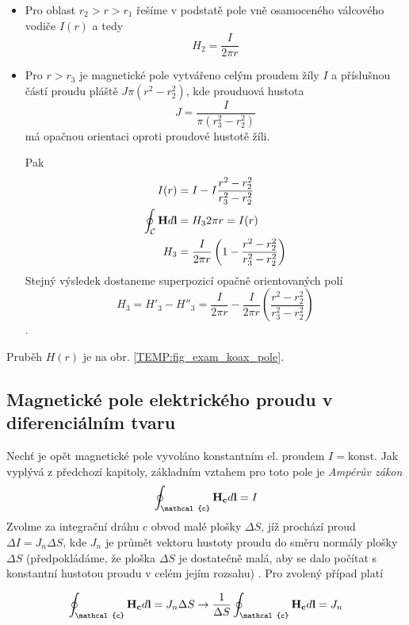 \begin{example}
\begin{itemize}
  		  \item Pro oblast $r_2>r>r_1$ řešíme v podstatě pole vně osamoceného válcového vodiče
  		        $I(r)$ a tedy $$H_2 = \frac{I}{2\pi r}$$
  		  \item Pro $r>r_3$ je magnetické pole vytvářeno celým proudem žíly $I$ a příslušnou částí
  		        proudu pláště $J\pi(r^2 - r_2^2)$, kde prouduová hustota $$J =
  		        \frac{I}{\pi(r_3^2-r_2^2)}$$ má opačnou orientaci oproti proudové hustotě žíli.
  		  
  		  Pak 
  		   \begin{align*}
			 I(r)                           &= I - I\frac{r^2-r_2^2}{r_3^2-r_2^2} \\
			 \oint_\mathcal{C}\mathbf{H}d\mathbf{l} &= H_32\pi r = I(r)                   \\				  
			 H_3                            &= \frac{I}{2\pi r}\left(1 - 
			                                   \frac{r^2 - r_2^2}{r_3^2 - r_2^2}\right) 
		   \end{align*}
		  Stejný výsledek dostaneme superpozicí opačně orientovaných polí $$H_3 = H'_3 - H''_3 =
		  \frac{I}{2\pi r} - \frac{I}{2\pi r}\left(\frac{r^2 - r_2^2}{r_3^2 - r_2^2}\right)$$. 
        \end{itemize}
        Pruběh $H(r)$ je na obr. \ref{TEMP:fig_exam_koax_pole}.
      \end{example}

    \subsection{Magnetické pole elektrického proudu v diferenciálním tvaru}
      Nechť je opět magnetické pole vyvoláno konstantním el. proudem $I = \text{konst}$. Jak
      vyplývá z předchozí kapitoly, základním vztahem pro toto pole je \emph{Ampérův zákon}
      $$\oint_\mathcal{c}\vr{H_c}d\vr{l} = I$$  Zvolme za integrační dráhu $c$ obvod malé plošky
      $\Delta S$, jíž prochází proud $\Delta I = J_n \Delta S$, kde $J_n$ je průmět vektoru hustoty
      proudu do směru normály plošky $\Delta S$ (předpokládáme, že ploška $\Delta S$ je dostatečně
      malá, aby se dalo počítat s konstantní hustotou proudu v celém jejím rozsahu)
      \cite[s.~13]{Trnka1972}. Pro zvolený případ platí
      
      \begin{equation}\label{TEMP:eq_amp_z1}
        \oint_\mathcal{c}\vr{H_c}d\vr{l}  =
           J_n \Delta S \rightarrow \frac{1}{\Delta S}\oint_\mathcal{c}\vr{H_c}d\vr{l} = J_n
      \end{equation} 
      
